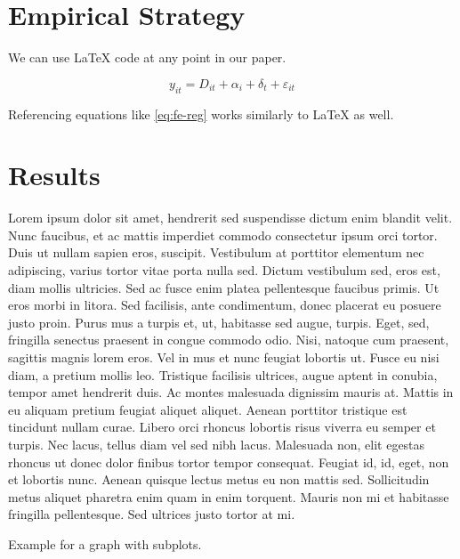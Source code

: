 \documentclass[
  12pt,
]{article}
\begin{document}
\hypertarget{strat}{%
\section{Empirical Strategy}\label{strat}}

We can use LaTeX code at any point in our paper.

\begin{equation}
y_{it} = D_{it} + \alpha_i + \delta_t + \varepsilon_{it} \label{eq:fe-reg}
\end{equation}

Referencing equations like \eqref{eq:fe-reg} works similarly to LaTeX as well.

\hypertarget{res}{%
\section{Results}\label{res}}

Lorem ipsum dolor sit amet, hendrerit sed suspendisse dictum enim blandit velit. Nunc faucibus, et ac mattis imperdiet commodo consectetur ipsum orci tortor. Duis ut nullam sapien eros, suscipit. Vestibulum at porttitor elementum nec adipiscing, varius tortor vitae porta nulla sed. Dictum vestibulum sed, eros est, diam mollis ultricies. Sed ac fusce enim platea pellentesque faucibus primis. Ut eros morbi in litora. Sed facilisis, ante condimentum, donec placerat eu posuere justo proin. Purus mus a turpis et, ut, habitasse sed augue, turpis. Eget, sed, fringilla senectus praesent in congue commodo odio. Nisi, natoque cum praesent, sagittis magnis lorem eros. Vel in mus et nunc feugiat lobortis ut. Fusce eu nisi diam, a pretium mollis leo. Tristique facilisis ultrices, augue aptent in conubia, tempor amet hendrerit duis. Ac montes malesuada dignissim mauris at. Mattis in eu aliquam pretium feugiat aliquet aliquet. Aenean porttitor tristique est tincidunt nullam curae. Libero orci rhoncus lobortis risus viverra eu semper et turpis. Nec lacus, tellus diam vel sed nibh lacus. Malesuada non, elit egestas rhoncus ut donec dolor finibus tortor tempor consequat. Feugiat id, id, eget, non et lobortis nunc. Aenean quisque lectus metus eu non mattis sed. Sollicitudin metus aliquet pharetra enim quam in enim torquent. Mauris non mi et habitasse fringilla pellentesque. Sed ultrices justo tortor at mi.

Example for a graph with subplots.
\end{document}
